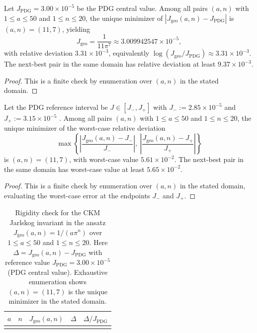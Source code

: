 \begin{proposition}\label{prop:jarlskog_rigidity}
Let $J_{\mathrm{PDG}}=3.00\times 10^{-5}$ be the PDG central value. Among all pairs $(a,n)$ with $1\le a\le 50$ and $1\le n\le 20$, the unique minimizer of $|J_{\mathrm{geo}}(a,n)-J_{\mathrm{PDG}}|$ is $(a,n)=(11,7)$, yielding
\begin{equation}
J_{\mathrm{geo}}=\frac{1}{11\pi^7}\approx 3.009942547\times 10^{-5},
\end{equation}
with relative deviation $3.31\times 10^{-3}$, equivalently $\log(J_{\mathrm{geo}}/J_{\mathrm{PDG}})\approx 3.31\times 10^{-3}$. The next-best pair in the same domain has relative deviation at least $9.37\times 10^{-3}$.
\end{proposition}
\begin{proof}
This is a finite check by enumeration over $(a,n)$ in the stated domain.
\end{proof}

\begin{proposition}\label{prop:jarlskog_minimax_rigidity}
Let the PDG reference interval be $J\in[J_-,J_+]$ with $J_-:=2.85\times 10^{-5}$ and $J_+:=3.15\times 10^{-5}$ \cite{PDGRPP2024}. Among all pairs $(a,n)$ with $1\le a\le 50$ and $1\le n\le 20$, the unique minimizer of the worst-case relative deviation
\begin{equation}
\max\!\left\{\left|\frac{J_{\mathrm{geo}}(a,n)-J_-}{J_-}\right|,\ \left|\frac{J_{\mathrm{geo}}(a,n)-J_+}{J_+}\right|\right\}
\end{equation}
is $(a,n)=(11,7)$, with worst-case value $5.61\times 10^{-2}$. The next-best pair in the same domain has worst-case value at least $5.65\times 10^{-2}$.
\end{proposition}
\begin{proof}
This is a finite check by enumeration over $(a,n)$ in the stated domain, evaluating the worst-case error at the endpoints $J_-$ and $J_+$.
\end{proof}

\begin{table}[t]
\centering
\begin{tabular}{@{}rrrcc@{}}
\toprule
$a$ & $n$ & $J_{\mathrm{geo}}(a,n)$ & $\Delta$ & $\Delta/J_{\mathrm{PDG}}$ \\
\midrule
%
\\
\bottomrule
\end{tabular}
\caption{Rigidity check for the CKM Jarlskog invariant in the ansatz $J_{\mathrm{geo}}(a,n)=1/(a\pi^n)$ over $1\le a\le 50$ and $1\le n\le 20$. Here $\Delta=J_{\mathrm{geo}}(a,n)-J_{\mathrm{PDG}}$ with reference value $J_{\mathrm{PDG}}=3.00\times 10^{-5}$ (PDG central value). Exhaustive enumeration shows $(a,n)=(11,7)$ is the unique minimizer in the stated domain.}
\label{tab:jarlskog_integer_search}
\end{table}

